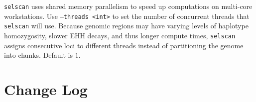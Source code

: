 \documentclass[12pt]{article}%
\begin{document}
{\tt selscan} uses shared memory parallelism to speed up computations on multi-core workstations.  Use {\tt --threads <int>} to set the number of concurrent threads that {\tt selscan} will use.  Because genomic regions may have varying levels of haplotype homozygosity, slower EHH decays, and thus longer compute times, {\tt selscan} assigns consecutive loci to different threads instead of partitioning the genome into chunks.  Default is $1$.


\section{Change Log}
\end{document}
